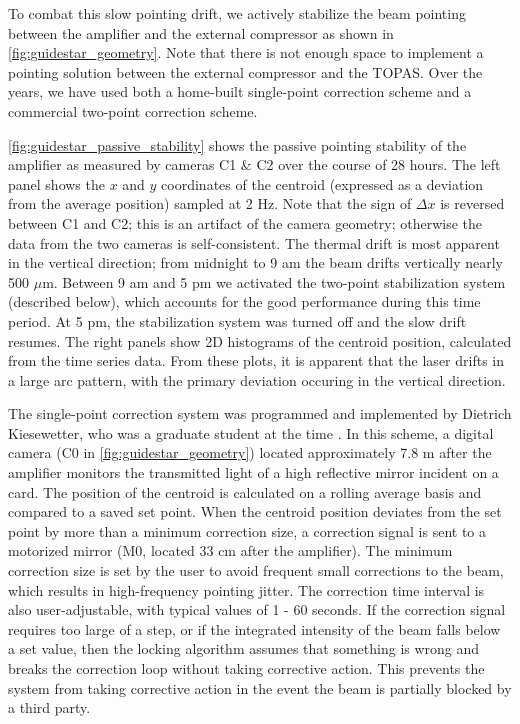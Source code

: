 To combat this slow pointing drift, we actively stabilize the beam pointing between the amplifier and the external compressor as shown in \cref{fig:guidestar_geometry}. Note that there is not enough space to implement a pointing solution between the external compressor and the TOPAS. Over the years, we have used both a home-built single-point correction scheme and a commercial two-point correction scheme.

\cref{fig:guidestar_passive_stability} shows the passive pointing stability of the amplifier as measured by cameras C1 \& C2 over the course of 28 hours. The left panel shows the $x$ and $y$ coordinates of the centroid (expressed as a deviation from the average position) sampled at 2 Hz. Note that the sign of $\Delta x$ is reversed between C1 and C2; this is an artifact of the camera geometry; otherwise the data from the two cameras is self-consistent. The thermal drift is most apparent in the vertical direction; from midnight to 9 am the beam drifts vertically nearly 500 $\mu$m. Between 9 am and 5 pm we activated the two-point stabilization system (described below), which accounts for the good performance during this time period. At 5 pm, the stabilization system was turned off and the slow drift resumes. The right panels show 2D histograms of the centroid position, calculated from the time series data. From these plots, it is apparent that the laser drifts in a large arc pattern, with the primary deviation occuring in the vertical direction.

The single-point correction system was programmed and implemented by Dietrich Kiesewetter, who was a graduate student at the time \cite{kiesewetterDynamicsNearThresholdAttosecond2019}. In this scheme, a digital camera (C0 in \cref{fig:guidestar_geometry}) located approximately 7.8 m after the amplifier monitors the transmitted light of a high reflective mirror incident on a card. The position of the centroid is calculated on a rolling average basis and compared to a saved set point. When the centroid position deviates from the set point by more than a minimum correction size, a correction signal is sent to a motorized mirror (M0, located 33 cm after the amplifier). The minimum correction size is set by the user to avoid frequent small corrections to the beam, which results in high-frequency pointing jitter. The correction time interval is also user-adjustable, with typical values of 1 - 60 seconds. If the correction signal requires too large of a step, or if the integrated intensity of the beam falls below a set value, then the locking algorithm assumes that something is wrong and breaks the correction loop without taking corrective action. This prevents the system from taking corrective action in the event the beam is partially blocked by a third party.


